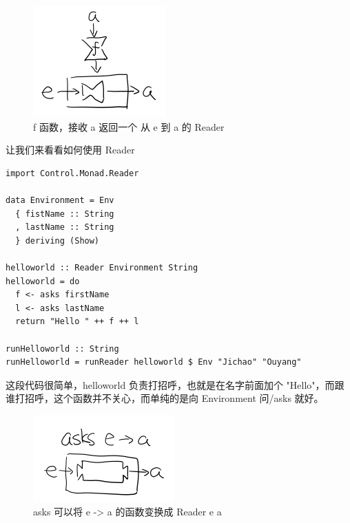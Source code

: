\documentclass[letterspacing]{tufte-book}
\begin{document}
\begin{figure}[htbp]
\centering
\includegraphics[width=.9\linewidth]{images/p2-reader-monad.png}
\caption{f 函数，接收 a 返回一个 从 e 到 a 的 Reader}
\end{figure}

让我们来看看如何使用 Reader
\lstset{language=haskell,label= ,caption= ,captionpos=b,numbers=none}
\begin{lstlisting}
import Control.Monad.Reader

data Environment = Env
  { fistName :: String
  , lastName :: String
  } deriving (Show)

helloworld :: Reader Environment String
helloworld = do
  f <- asks firstName
  l <- asks lastName
  return "Hello " ++ f ++ l

runHelloworld :: String
runHelloworld = runReader helloworld $ Env "Jichao" "Ouyang"
\end{lstlisting}

这段代码很简单，helloworld 负责打招呼，也就是在名字前面加个 "Hello"，而跟谁打招呼，这个函数并不关心，而单纯的是向 Environment 问/asks 就好。

\begin{figure}[htbp]
\centering
\includegraphics[width=.9\linewidth]{images/p2-reader-monad-ask.png}
\caption{asks 可以将 e -> a 的函数变换成 Reader e a}
\end{figure}
\end{document}
